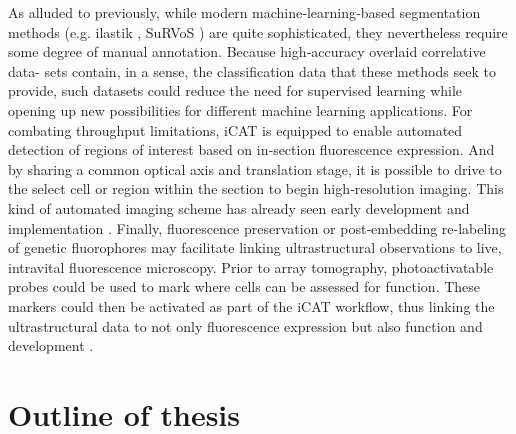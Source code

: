As alluded to previously, while modern machine‐learning‐based segmentation methods (e.g. ilastik \cite{sommer2011ilastik}, SuRVoS \cite{luengo2017survos}) are quite sophisticated, they nevertheless require some degree of manual annotation. Because high‐accuracy overlaid correlative data- sets contain, in a sense, the classification data that these methods seek to provide, such datasets could reduce the need for supervised learning while opening up new possibilities for different machine learning applications. For combating throughput limitations, iCAT is equipped to enable automated detection of regions of interest based on in‐section fluorescence expression. And by sharing a common optical axis and translation stage, it is possible to drive to the select cell or region within the section to begin high‐resolution imaging. This kind of automated imaging scheme has already seen early development and implementation \cite{delpiano2018automated}. Finally, fluorescence preservation or post‐embedding re-labeling of genetic fluorophores may facilitate linking ultrastructural observations to live, intravital fluorescence microscopy. Prior to array tomography, photoactivatable probes could be used to mark where cells can be assessed for function. These markers could then be activated as part of the iCAT workflow, thus linking the ultrastructural data to not only fluorescence expression but also function and development \cite{collinson2017correlating}.


\section{Outline of thesis}
